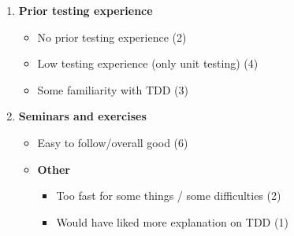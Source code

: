 \begin{enumerate}
    \item \textbf{Prior testing experience}
    \begin{itemize}
        \item No prior testing experience (2)
        \item Low testing experience (only unit testing) (4)
        \item Some familiarity with TDD (3)
    \end{itemize}

    \item \textbf{Seminars and exercises}
    \begin{itemize}
        \item Easy to follow/overall good (6)
        \item \textbf{Other}
        \begin{itemize}
            \item Too fast for some things / some difficulties (2)
            \item Would have liked more explanation on TDD (1)
        \end{itemize}
    \end{itemize}
\end{enumerate}



